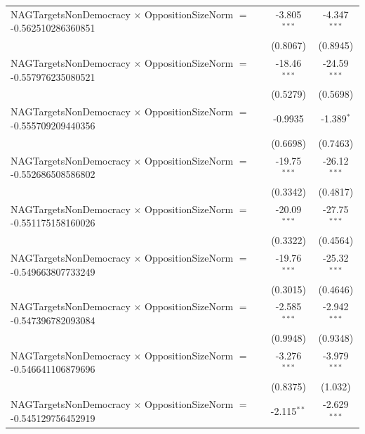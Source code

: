 \begin{tabular}{lcc}
   NAGTargetsNonDemocracy $\times$ OppositionSizeNorm $=$ -0.562510286360851    & -3.805$^{***}$       & -4.347$^{***}$\\   
                                                                                & (0.8067)             & (0.8945)\\   
   NAGTargetsNonDemocracy $\times$ OppositionSizeNorm $=$ -0.557976235080521    & -18.46$^{***}$       & -24.59$^{***}$\\   
                                                                                & (0.5279)             & (0.5698)\\   
   NAGTargetsNonDemocracy $\times$ OppositionSizeNorm $=$ -0.555709209440356    & -0.9935              & -1.389$^{*}$\\   
                                                                                & (0.6698)             & (0.7463)\\   
   NAGTargetsNonDemocracy $\times$ OppositionSizeNorm $=$ -0.552686508586802    & -19.75$^{***}$       & -26.12$^{***}$\\   
                                                                                & (0.3342)             & (0.4817)\\   
   NAGTargetsNonDemocracy $\times$ OppositionSizeNorm $=$ -0.551175158160026    & -20.09$^{***}$       & -27.75$^{***}$\\   
                                                                                & (0.3322)             & (0.4564)\\   
   NAGTargetsNonDemocracy $\times$ OppositionSizeNorm $=$ -0.549663807733249    & -19.76$^{***}$       & -25.32$^{***}$\\   
                                                                                & (0.3015)             & (0.4646)\\   
   NAGTargetsNonDemocracy $\times$ OppositionSizeNorm $=$ -0.547396782093084    & -2.585$^{***}$       & -2.942$^{***}$\\   
                                                                                & (0.9948)             & (0.9348)\\   
   NAGTargetsNonDemocracy $\times$ OppositionSizeNorm $=$ -0.546641106879696    & -3.276$^{***}$       & -3.979$^{***}$\\   
                                                                                & (0.8375)             & (1.032)\\   
   NAGTargetsNonDemocracy $\times$ OppositionSizeNorm $=$ -0.545129756452919    & -2.115$^{**}$        & -2.629$^{***}$\\   

\end{tabular}

